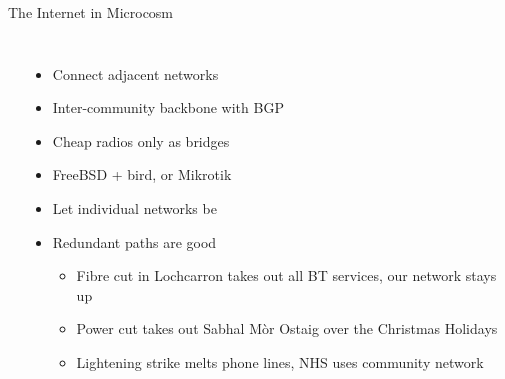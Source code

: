 \documentclass{beamer}
\begin{document}
\begin{frame}{The Internet in Microcosm}
  \begin{columns}
    \begin{center}
      \vspace{-1\baselineskip}%
      \hspace{1em}
    \end{center}
    \begin{itemize}
      \item Connect adjacent networks
      \item Inter-community backbone with BGP
      \item Cheap radios only as bridges
      \item FreeBSD + bird, or Mikrotik
      \item Let individual networks be
      \item Redundant paths are good
        \begin{itemize}
          \item Fibre cut in Lochcarron takes out all BT services, our
            network stays up
          \item Power cut takes out Sabhal M\`{o}r Ostaig over the
            Christmas Holidays
          \item Lightening strike melts phone lines, NHS uses
            community network
        \end{itemize}
    \end{itemize}
  \end{columns}
\end{frame}
\end{document}
